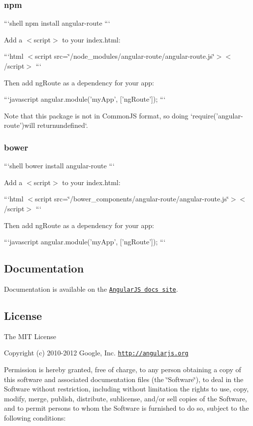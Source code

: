 \subsubsection*{npm}

```shell npm install angular-\/route ```

Add a {\ttfamily $<$script$>$} to your {\ttfamily index.\-html}\-:

```html $<$script src=\char`\"{}/node\-\_\-modules/angular-\/route/angular-\/route.\-js\char`\"{}$>$$<$/script$>$ ```

Then add {\ttfamily ng\-Route} as a dependency for your app\-:

```javascript angular.\-module('my\-App', \mbox{[}'ng\-Route'\mbox{]}); ```

Note that this package is not in Common\-J\-S format, so doing `require('angular-\/route'){\ttfamily will return}undefined`.

\subsubsection*{bower}

```shell bower install angular-\/route ```

Add a {\ttfamily $<$script$>$} to your {\ttfamily index.\-html}\-:

```html $<$script src=\char`\"{}/bower\-\_\-components/angular-\/route/angular-\/route.\-js\char`\"{}$>$$<$/script$>$ ```

Then add {\ttfamily ng\-Route} as a dependency for your app\-:

```javascript angular.\-module('my\-App', \mbox{[}'ng\-Route'\mbox{]}); ```

\subsection*{Documentation}

Documentation is available on the \href{http://docs.angularjs.org/api/ngRoute}{\tt Angular\-J\-S docs site}.

\subsection*{License}

The M\-I\-T License

Copyright (c) 2010-\/2012 Google, Inc. \href{http://angularjs.org}{\tt http\-://angularjs.\-org}

Permission is hereby granted, free of charge, to any person obtaining a copy of this software and associated documentation files (the \char`\"{}\-Software\char`\"{}), to deal in the Software without restriction, including without limitation the rights to use, copy, modify, merge, publish, distribute, sublicense, and/or sell copies of the Software, and to permit persons to whom the Software is furnished to do so, subject to the following conditions\-:

